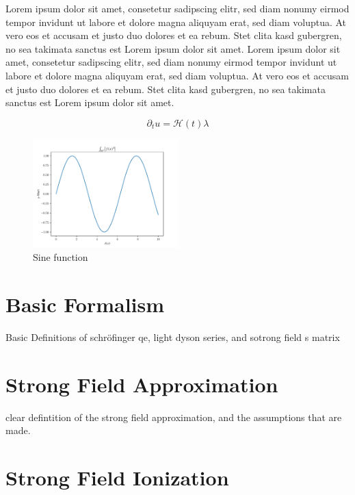Lorem ipsum dolor sit amet, consetetur sadipscing elitr, sed diam nonumy eirmod tempor invidunt ut labore et dolore magna aliquyam erat, sed diam voluptua. At vero eos et accusam et justo duo dolores et ea rebum. Stet clita kasd gubergren, no sea takimata sanctus est Lorem ipsum dolor sit amet. Lorem ipsum dolor sit amet, consetetur sadipscing elitr, sed diam nonumy eirmod tempor invidunt ut labore et dolore magna aliquyam erat, sed diam voluptua. At vero eos et accusam et justo duo dolores et ea rebum. Stet clita kasd gubergren, no sea takimata sanctus est Lorem ipsum dolor sit amet.

\begin{equation}
    \partial_t u = \mathcal{H}(t)  \lambda 
\end{equation}

\begin{figure}[H]
    \centering
    \includegraphics[width=0.5\textwidth]{figures/plot.pdf}
    \caption{Sine function}
    \label{fig:sinus}
\end{figure}




\newpage
\section{Basic Formalism}

Basic Definitions of schröfinger qe, light dyson series, and sotrong field s matrix


\newpage
\section{Strong Field Approximation}

clear defintition of the strong field approximation, and the assumptions that are made.



\newpage
\section{Strong Field Ionization}


